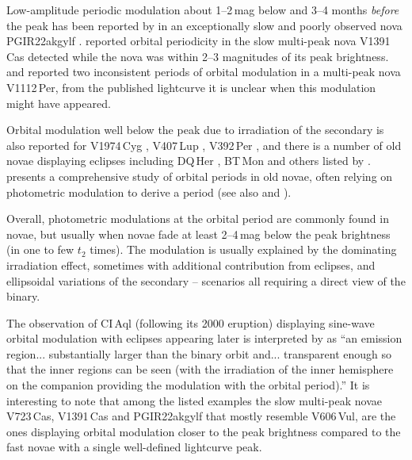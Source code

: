 \documentclass[twocolumn]{aastex631}
\newcommand{\nova}{V606\,Vul}
\begin{document}
Low-amplitude periodic modulation about 1--2\,mag below and 3--4 months 
{\it before} the peak has been reported by \cite{2022JAVSO..50..260S} in 
an exceptionally slow and poorly observed nova PGIR22akgylf \citep{2022ATel15587....1D}.
\cite{2021JAVSO..49...95S} reported orbital periodicity in the slow multi-peak
nova V1391\,Cas detected while the nova was within 2--3 magnitudes of its peak brightness.
\cite{2021JAVSO..49...99S} and \cite{2021JAVSO..49..151T} reported two
inconsistent periods of orbital modulation in a multi-peak nova
V1112\,Per, from the published lightcurve it is unclear when this modulation
might have appeared.
%
%

Orbital modulation well below the peak due to 
irradiation of the secondary is also reported for V1974\,Cyg \citep{1994ApJ...431L..47D}, 
V407\,Lup \citep{2018MNRAS.480..572A},
V392\,Per \citep[][]{2020A&A...639L..10M,2022MNRAS.514.6183M}, 
and there is a number of old novae displaying eclipses including DQ\,Her \citep{1995ApJ...454..447Z}, BT\,Mon
and others listed by \cite{2020MNRAS.492.3323S}.
\cite{2022MNRAS.517.3640S} presents a comprehensive study of orbital periods
in old novae, often relying on photometric modulation to derive a period
(see also \citealt{2021RNAAS...5..150S} and \citealt{2021MNRAS.501.6083F}).

Overall, photometric modulations at the orbital period are commonly found in
novae, but usually when novae fade at least 2--4\,mag below the peak brightness (in one to few $t_2$ times). 
The modulation is usually explained by the dominating irradiation effect,
sometimes with additional contribution from eclipses, and ellipsoidal variations 
of the secondary -- scenarios all requiring a direct view of the binary.

The observation of CI\,Aql (following its 2000 eruption) displaying sine-wave orbital modulation with
eclipses appearing later is interpreted by \cite{2011ApJ...742..112S} as 
``an emission region... substantially larger than the binary orbit
and... transparent enough so that the inner regions
can be seen (with the irradiation of the inner hemisphere on the
companion providing the modulation with the orbital period).''
It is interesting to note that among the listed examples the slow multi-peak
novae V723\,Cas, V1391\,Cas and PGIR22akgylf that mostly resemble \nova{}, are the ones 
displaying orbital modulation closer to the peak brightness compared to 
the fast novae with a single well-defined lightcurve peak.
\end{document}
